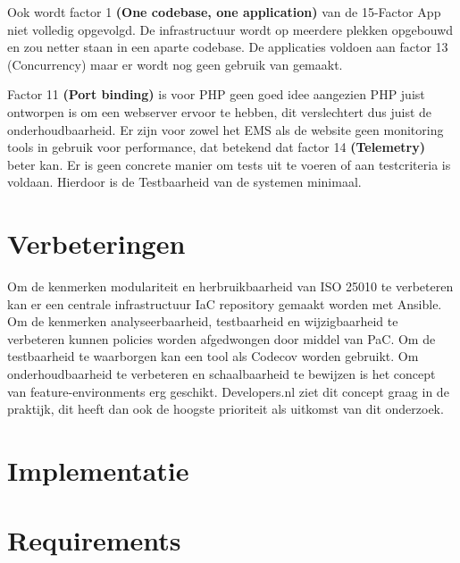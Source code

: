 Ook wordt factor 1 \textbf{(One codebase, one application)} van de 15-Factor App niet volledig opgevolgd. De infrastructuur wordt op meerdere plekken opgebouwd en zou netter staan in een aparte codebase. De applicaties voldoen aan factor 13 (Concurrency) maar er wordt nog geen gebruik van gemaakt. 

Factor 11 \textbf{(Port binding)} is voor PHP geen goed idee aangezien PHP juist ontworpen is om een webserver ervoor te hebben, dit verslechtert dus juist de onderhoudbaarheid. Er zijn voor zowel het EMS als de website geen monitoring tools in gebruik voor performance, dat betekend dat factor 14 \textbf{(Telemetry)} beter kan. Er is geen concrete manier om tests uit te voeren of aan testcriteria is voldaan. Hierdoor is de Testbaarheid van de systemen minimaal.

\section{Verbeteringen}
Om de kenmerken modulariteit en herbruikbaarheid van ISO 25010 te verbeteren kan er een centrale infrastructuur IaC repository gemaakt worden met Ansible. Om de kenmerken analyseerbaarheid, testbaarheid en wijzigbaarheid te verbeteren kunnen policies worden afgedwongen door middel van PaC. Om de testbaarheid te waarborgen kan een tool als Codecov worden gebruikt. Om onderhoudbaarheid te verbeteren en schaalbaarheid te bewijzen is het concept van feature-environments erg geschikt. Developers.nl ziet dit concept graag in de praktijk, dit heeft dan ook de hoogste prioriteit als uitkomst van dit onderzoek.

\section{Implementatie}

\section{Requirements}

